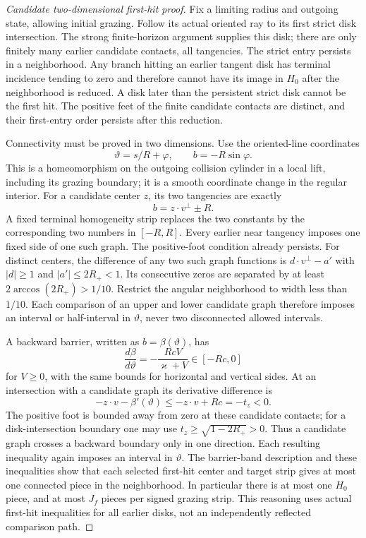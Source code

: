 \begin{proof}[Candidate two-dimensional first-hit proof]
Fix a limiting radius and outgoing state, allowing initial grazing.
Follow its actual oriented ray to its first strict disk intersection.
The strong finite-horizon argument supplies this disk; there are
only finitely many earlier candidate contacts, all tangencies.
The strict entry persists in a neighborhood.
Any branch hitting an earlier tangent disk has terminal incidence
tending to zero and therefore cannot have its image in $H_0$ after
the neighborhood is reduced.
A disk later than the persistent strict disk cannot be the first hit.
The positive feet of the finite candidate contacts are distinct,
and their first-entry order persists after this reduction.

Connectivity must be proved in two dimensions.
Use the oriented-line coordinates
\[
 \vartheta=s/R+\varphi,\qquad b=-R\sin\varphi.
\]
This is a homeomorphism on the outgoing collision cylinder in a
local lift, including its grazing boundary; it is a smooth
coordinate change in the regular interior.
For a candidate center $z$, its two tangencies are exactly
\[
 b=z\cdot v^\perp\pm R.
\]
A fixed terminal homogeneity strip replaces the two constants by
the corresponding two numbers in $[-R,R]$.
Every earlier near tangency imposes one fixed side of one such
graph.  The positive-foot condition already persists.
For distinct centers, the difference of any two such graph
functions is $d\cdot v^\perp-a'$ with
$|d|\ge1$ and $|a'|\le2R_+<1$.
Its consecutive zeros are separated by at least
$2\arccos(2R_+)>1/10$.
Restrict the angular neighborhood to width less than $1/10$.
Each comparison of an upper and lower candidate graph therefore
imposes an interval or half-interval in $\vartheta$, never two
disconnected allowed intervals.

A backward barrier, written as $b=\beta(\vartheta)$, has
\[
 \frac{d\beta}{d\vartheta}
       =-\frac{RcV}{\varkappa+V}\in[-Rc,0]
\]
for $V\ge0$, with the same bounds for horizontal and vertical sides.
At an intersection with a candidate graph its derivative difference is
\[
 -z\cdot v-\beta'(\vartheta)
       \le-z\cdot v+Rc=-t_z<0.
\]
The positive foot is bounded away from zero at these candidate
contacts; for a disk-intersection boundary one may use
$t_z\ge\sqrt{1-2R_+}>0$.
Thus a candidate graph crosses a backward boundary only in one
direction.  Each resulting inequality again imposes an interval
in $\vartheta$.
The barrier-band description and these inequalities show that
each selected first-hit center and target strip gives at most one
connected piece in the neighborhood.
In particular there is at most one $H_0$ piece, and at most $J_f$
pieces per signed grazing strip.
This reasoning uses actual first-hit inequalities for all earlier
disks, not an independently reflected comparison path.


\end{proof}
